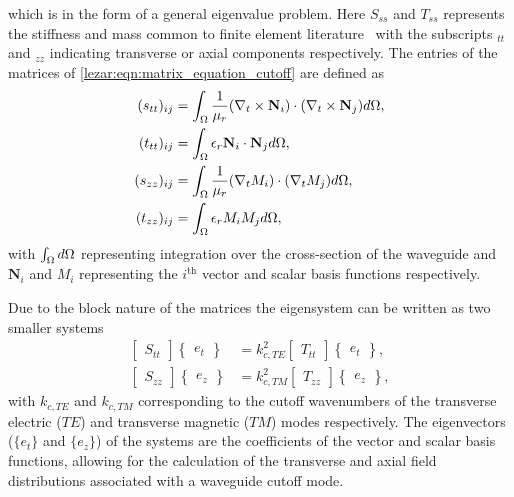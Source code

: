 which is in the form of a general eigenvalue problem.  Here $S_{ss}$ and $T_{ss}$ represents the stiffness and
mass common to finite element literature~\cite{Dav2005, Jin2002} with
the subscripts $_{tt}$ and $_{zz}$ indicating transverse or axial
components respectively.  The entries of the matrices of
\eqref{lezar:eqn:matrix_equation_cutoff} are defined as
\begin{align}
\label{lezar:eqn:s_tt_ij}
(s_{tt})_{ij} &= \intoverdomain{\frac{1}{\mu_r}(\curl{\mathbf{N}_i}{t})\cdot(\curl{\mathbf{N}_j}{t})}{\Omega},\\
\label{lezar:eqn:t_tt_ij}
(t_{tt})_{ij} &= \intoverdomain{\epsilon_r\mathbf{N}_i\cdot\mathbf{N}_j}{\Omega},\\
\label{lezar:eqn:s_zz_ij}
(s_{zz})_{ij} &= \intoverdomain{\frac{1}{\mu_r}(\nabla_t{M_i})\cdot(\nabla_t{M_j})}{\Omega},\\
\label{lezar:eqn:t_zz_ij}
(t_{zz})_{ij} &= \intoverdomain{\epsilon_r M_i M_j}{\Omega},
\end{align}
with $\int_{\Omega}{}{d\Omega}$ representing integration over the
cross-section of the waveguide and $\mathbf{N}_i$ and $M_i$
representing the $i^{\text{th}}$ vector and scalar basis functions
respectively.

Due to the block nature of the matrices the eigensystem can be written
as two smaller systems
\begin{align}
    \begin{bmatrix}S_{tt}\end{bmatrix}\begin{Bmatrix}e_t\end{Bmatrix} &=
    k_{c,TE}^{2}\begin{bmatrix}
    T_{tt}\end{bmatrix}\begin{Bmatrix}e_t\end{Bmatrix},\\
    \begin{bmatrix}S_{zz}\end{bmatrix}\begin{Bmatrix}e_z\end{Bmatrix} &= k_{c,TM}^{2}\begin{bmatrix}T_{zz}\end{bmatrix}\begin{Bmatrix}e_z\end{Bmatrix},
\end{align}
with $k_{c,TE}$ and $k_{c,TM}$ corresponding to the cutoff
wavenumbers of the transverse electric ($TE$)
and transverse magnetic ($TM$) modes respectively. The eigenvectors
($\{e_t\}$ and $\{e_z\}$) of the systems are the coefficients of the
vector and scalar basis functions, allowing for the calculation of the
transverse and axial field distributions associated with a waveguide
cutoff mode.

